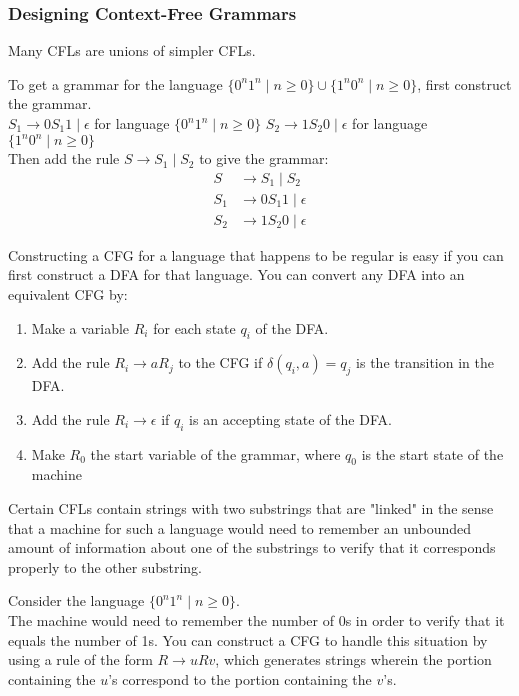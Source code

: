 \documentclass[11pt,a4paper]{article}
\begin{document}
\subsubsection{Designing Context-Free Grammars}

Many CFLs are unions of simpler CFLs. \\

\begin{example}
    To get a grammar for the language $\{0^n1^n\mid n\geq 0\}\cup \{1^n0^n\mid n\geq 0\}$, first construct the grammar. \\

    $S_1\rightarrow 0S_1 1\mid\epsilon$ for language $\{0^n1^n\mid n\geq 0\}$
    $S_2\rightarrow1S_2 0\mid\epsilon$ for language $\{1^n0^n\mid n\geq 0\}$ \\

    Then add the rule $S\rightarrow S_1\mid S_2$ to give the grammar:
    \begin{align*}
        S &\rightarrow S_1\mid S_2 \\
        S_1 &\rightarrow 0S_1 1\mid\epsilon \\
        S_2 &\rightarrow 1S_2 0\mid\epsilon
    \end{align*}
\end{example}

Constructing a CFG for a language that happens to be regular is easy if you can first construct a DFA for that language.
You can convert any DFA into an equivalent CFG by:
\begin{enumerate}
    \item Make a variable $R_i$ for each state $q_i$ of the DFA.
    \item Add the rule $R_i\rightarrow aR_j$ to the CFG if $\delta(q_i,a)=q_j$ is the transition in the DFA.
    \item Add the rule $R_i\rightarrow\epsilon$ if $q_i$ is an accepting state of the DFA.
    \item Make $R_0$ the start variable of the grammar, where $q_0$ is the start state of the machine
\end{enumerate}

Certain CFLs contain strings with two substrings that are "linked" in the sense that a machine for such a language would need to remember an unbounded amount of information about one of the substrings to verify that it corresponds properly to the other substring. \\

\begin{example}
    Consider the language $\{0^n1^n\mid n\geq 0\}$. \\

    The machine would need to remember the number of 0s in order to verify that it equals the number of 1s.
    You can construct a CFG to handle this situation by using a rule of the form $R\rightarrow uRv$, which generates strings wherein the portion containing the $u$'s correspond to the portion containing the $v$'s.
\end{example}
\end{document}
